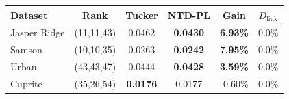 \begin{tabular}{@{}l c c c c c@{}}
    \toprule
    Dataset & Rank & Tucker & NTD-PL & Gain & $D_{\mathrm{link}}$ \\
    \midrule
    Jasper Ridge & (11,11,43) & 0.0462 & \textbf{0.0430} & \textbf{6.93\%} & 0.0\% \\
    Samson & (10,10,35) & 0.0263 & \textbf{0.0242} & \textbf{7.95\%} & 0.0\% \\
    Urban & (43,43,47) & 0.0444 & \textbf{0.0428} & \textbf{3.59\%} & 0.0\% \\
    Cuprite & (35,26,54) & \textbf{0.0176} & 0.0177 & -0.60\% & 0.0\% \\
    \bottomrule
\end{tabular}
